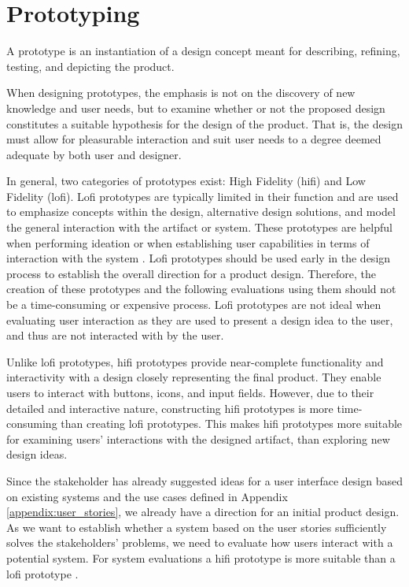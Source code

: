 \section{Prototyping}
A prototype is an instantiation of a design concept meant for describing, refining, testing, and depicting the product.\cite{BUXTON2007139_prototyping}

When designing prototypes, the emphasis is not on the discovery of new knowledge and user needs, but to examine whether or not the proposed design constitutes a suitable hypothesis for the design of the product\cite{nielsen-norman-prototype-low-vs-high,BUXTON2007139_prototyping}.
That is, the design must allow for pleasurable interaction and suit user needs to a degree deemed adequate by both user and designer.

In general, two categories of prototypes exist: High Fidelity (hifi) and Low Fidelity (lofi).
Lofi prototypes are typically limited in their function and are used to emphasize concepts within the design, alternative design solutions, and model the general interaction with the artifact or system\cite{low-vs-high-fidelity-prototype}.
These prototypes are helpful when performing ideation\cite{nielsen-norman-ideation} or when establishing user capabilities in terms of interaction with the system \cite{usefullness-of-different-prototypes,low-vs-high-fidelity-prototype}.
Lofi prototypes should be used early in the design process to establish the overall direction for a product design. 
Therefore, the creation of these prototypes and the following evaluations using them should not be a time-consuming or expensive process. \cite{usefullness-of-different-prototypes,low-vs-high-fidelity-prototype} 
Lofi prototypes are not ideal when evaluating user interaction as they are used to present a design idea to the user, and thus are not interacted with by the user\cite{low-vs-high-fidelity-prototype}.

Unlike lofi prototypes, hifi prototypes provide near-complete functionality and interactivity with a design closely representing the final product.
They enable users to interact with buttons, icons, and input fields.
However, due to their detailed and interactive nature, constructing hifi prototypes is more time-consuming than creating lofi prototypes. 
This makes hifi prototypes more suitable for examining users' interactions with the designed artifact, than exploring new design ideas. \cite{nielsen-norman-prototype-low-vs-high,low-vs-high-fidelity-prototype}

Since the stakeholder has already suggested ideas for a user interface design based on existing systems and the use cases defined in Appendix \ref{appendix:user_stories}, we already have a direction for an initial product design. 
As we want to establish whether a system based on the user stories sufficiently solves the stakeholders' problems, we need to evaluate how users interact with a potential system.
For system evaluations a hifi prototype is more suitable than a lofi prototype \cite{low-vs-high-fidelity-prototype}.

